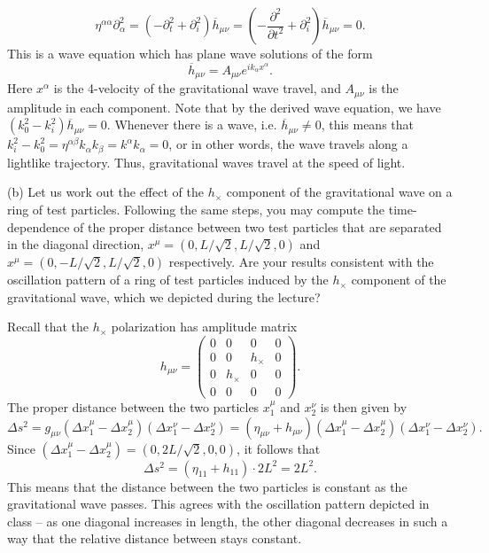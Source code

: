 \documentclass{../../templates/lkx_pset}
\begin{document}
\begin{parts}
  \[
    \eta^{\alpha\alpha}\partial_\alpha^2 = (-\partial_t^2 + \partial_i^2)\overline{h}_{\mu\nu} = \left(-\frac{\partial^2}{\partial t^2} + \partial_i^2\right)\overline{h}_{\mu\nu} = 0.
  \]
  This is a wave equation which has plane wave solutions of the form
  \[
    \overline{h}_{\mu\nu} = A_{\mu\nu} e^{ik_\alpha x^\alpha}.
  \]
  Here $x^\alpha$ is the 4-velocity of the gravitational wave travel, and $A_{\mu\nu}$ is the amplitude in each component. Note that by the derived wave equation, we have $(k_0^2-k_i^2) \overline{h}_{\mu\nu}=0$. Whenever there is a wave, i.e. $\overline{h}_{\mu\nu}\neq 0$, this means that $k_i^2-k_0^2=\eta^{\alpha\beta}k_{\alpha}k_\beta=k^\alpha k_\alpha=0$, or in other words, the wave travels along a lightlike trajectory. Thus, gravitational waves travel at the speed of light.

  \begin{part}{(b)}
    Let us work out the effect of the $h_{\times}$ component of the gravitational wave on a ring of test particles. Following the same steps, you may compute the time-dependence of the proper distance between two test particles that are separated in the diagonal direction, $x^\mu = (0,L/\sqrt{2}, L/\sqrt{2},0)$ and $x^{\mu} = (0,-L/\sqrt{2},L/\sqrt{2},0)$ respectively. Are your results consistent with the oscillation pattern of a ring of test particles induced by the $h_\times$ component of the gravitational wave, which we depicted during the lecture?
  \end{part}

  Recall that the $h_\times$ polarization has amplitude matrix
  \[
    h_{\mu\nu} = \begin{pmatrix}
      0&0&0&0\\
      0&0&h_\times&0\\
      0&h_\times&0&0\\
      0&0&0&0
    \end{pmatrix}.
  \]
  The proper distance between the two particles $x^\mu_1$ and $x^\nu_2$ is then given by
  \[
    \Delta s^2 = g_{\mu\nu} (\Delta x^\mu_1 - \Delta x^\mu_2)(\Delta x^\nu_1 - \Delta x^\nu_2) = (\eta_{\mu\nu} + h_{\mu\nu})(\Delta x^\mu_1 - \Delta x^\mu_2)(\Delta x^\nu_1 - \Delta x^\nu_2).
  \]
  Since $(\Delta x^{\mu}_1 - \Delta x^\mu_2)=(0,2L/\sqrt{2},0,0)$, it follows that
  \[
    \Delta s^2 = (\eta_{11} + h_{11}) \cdot 2L^2 = 2L^2.
  \]
  This means that the distance between the two particles is constant as the gravitational wave passes. This agrees with the oscillation pattern depicted in class -- as one diagonal increases in length, the other diagonal decreases in such a way that the relative distance between stays constant.


\end{parts}
\end{document}
